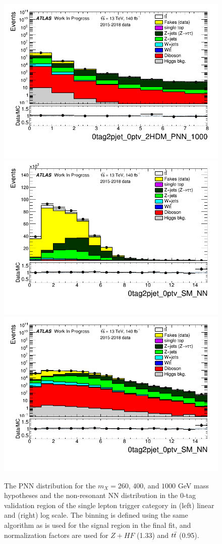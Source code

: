 \begin{figure}
\includegraphics[width=.45\textwidth]{DiHiggs/plots/lephadFF/SLT/0tag2pjet_0ptv_2HDM_PNN_1000_SLT_ALLFAKES_Bulb_noNeg_log.png}\\
\includegraphics[width=.45\textwidth]{DiHiggs/plots/lephadFF/SLT/0tag2pjet_0ptv_SM_NN_SLT_ALLFAKES_Bulb_noNeg_lin.png}
\includegraphics[width=.45\textwidth]{DiHiggs/plots/lephadFF/SLT/0tag2pjet_0ptv_SM_NN_SLT_ALLFAKES_Bulb_noNeg_log.png}
\caption{The PNN distribution for the $m_{X} = 260$, $400$, and $1000$ GeV mass hypotheses and the non-resonant NN distribution in the $0$-tag validation region of the single lepton trigger category in (left) linear and (right) log scale. The binning is defined using the same algorithm as is used for the signal region in the final fit, and normalization factors are used for $Z+HF$ (1.33) and $t\bar{t}$ (0.95).}
\label{fig:SLT_0tag}
\end{figure}    

